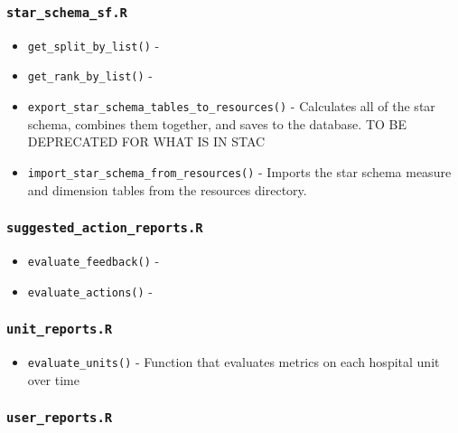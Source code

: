 \documentclass[
]{book}
\providecommand{\tightlist}{%
  \setlength{\itemsep}{0pt}\setlength{\parskip}{0pt}}
\begin{document}
\hypertarget{star_schema_sf.r}{%
\subsubsection{\texorpdfstring{\texttt{star\_schema\_sf.R}}{star\_schema\_sf.R}}\label{star_schema_sf.r}}

\begin{itemize}
\tightlist
\item
  \texttt{get\_split\_by\_list()} -
\item
  \texttt{get\_rank\_by\_list()} -
\item
  \texttt{export\_star\_schema\_tables\_to\_resources()} - Calculates all of the star schema, combines them together, and saves to the database. TO BE DEPRECATED FOR WHAT IS IN STAC
\item
  \texttt{import\_star\_schema\_from\_resources()} - Imports the star schema measure and dimension tables from the resources directory.
\end{itemize}

\hypertarget{suggested_action_reports.r}{%
\subsubsection{\texorpdfstring{\texttt{suggested\_action\_reports.R}}{suggested\_action\_reports.R}}\label{suggested_action_reports.r}}

\begin{itemize}
\tightlist
\item
  \texttt{evaluate\_feedback()} -
\item
  \texttt{evaluate\_actions()} -
\end{itemize}

\hypertarget{unit_reports.r}{%
\subsubsection{\texorpdfstring{\texttt{unit\_reports.R}}{unit\_reports.R}}\label{unit_reports.r}}

\begin{itemize}
\tightlist
\item
  \texttt{evaluate\_units()} - Function that evaluates metrics on each hospital unit over time
\end{itemize}

\hypertarget{user_reports.r}{%
\subsubsection{\texorpdfstring{\texttt{user\_reports.R}}{user\_reports.R}}\label{user_reports.r}}
\end{document}
